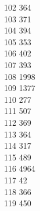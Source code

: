 { 102	364 \\
 103	371 \\
 104	394 \\
 105	353 \\
 106	402 \\
 107	393 \\
 108	1998 \\
 109	1377 \\
 110	277 \\
 111	507 \\
 112	369 \\
 113	364 \\
 114	317 \\
 115	489 \\
 116	4964 \\
 117	42 \\
 118	366 \\
 119	450 \\
}
